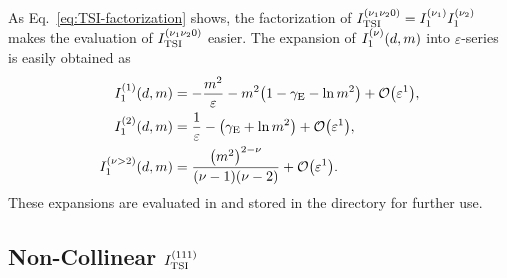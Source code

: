 \documentclass{article}
\begin{document}
            As Eq.~\eqref{eq:TSI-factorization} shows, the factorization of $\TSI{\nu_1 \nu_2 0} = \Ione{\nu_1} \Ione{\nu_2}$ makes the evaluation of $\TSI{\nu_1 \nu_2 0}$ easier.
            The expansion of $\Ione{\nu}[d, m]$ into $\varepsilon$-series is easily obtained as
            \begin{align}
                \Ione{1}[d, m] & = -\frac{m^2}{\varepsilon} - m^2 \qty(1 - \eulergamma - \ln m^2) + \order{\varepsilon^1}, \\
                \Ione{2}[d, m] & = \frac{1}{\varepsilon} - \qty(\eulergamma + \ln m^2) + \order{\varepsilon^1}, \\
                \Ione{\nu > 2}[d, m] & = \frac{\qty(m^2)^{2 - \nu}}{\qty(\nu - 1) \qty(\nu - 2)} + \order{\varepsilon^1}.
            \end{align}
            These expansions are evaluated in  and stored in the directory  for further use.

        \subsection{\boldmath Non-Collinear \texorpdfstring{$\TSI{111}$}{TSI-111}}
\end{document}
